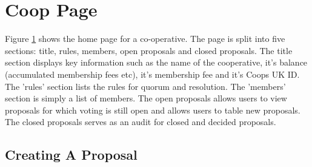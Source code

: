 \section{Coop Page}

\begin{figure}
\centering
{}
\decoRule
\caption[]{}
\label{fig:cooppage}
\end{figure}

Figure \ref{fig:cooppage} shows the home page for a co-operative. The page is split into five sections: title, rules, members, open proposals and closed proposals. The title section displays key information such as the name of the cooperative, it's balance (accumulated membership fees etc), it's membership fee and it's Coops UK ID. The 'rules' section lists the rules for quorum and resolution. The 'members' section is simply a list of members. The open proposals allows users to view proposals for which voting is still open and allows users to table new proposals. The closed proposals serves as an audit for closed and decided proposals. \\

\subsection{Creating A Proposal}

